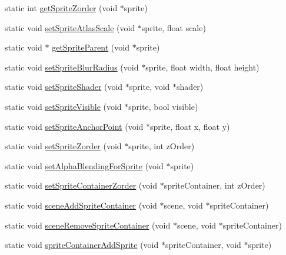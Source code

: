 \begin{DoxyCompactItemize}
\item 
static int \hyperlink{class_g_a_f_1_1_g_a_f_marmalade_g_f_x_a66e33e99c61c1c32fd5335f7a563b42e}{get\-Sprite\-Zorder} (void $\ast$sprite)
\item 
static void \hyperlink{class_g_a_f_1_1_g_a_f_marmalade_g_f_x_a4094142fd3844a976e0ca03a5c64098f}{set\-Sprite\-Atlas\-Scale} (void $\ast$sprite, float scale)
\item 
static void $\ast$ \hyperlink{class_g_a_f_1_1_g_a_f_marmalade_g_f_x_a2b2282d1facfe40492e1d26ebc6c99dd}{get\-Sprite\-Parent} (void $\ast$sprite)
\item 
static void \hyperlink{class_g_a_f_1_1_g_a_f_marmalade_g_f_x_a5139d0f53eee9c67fa0995b1a8a2c9a4}{set\-Sprite\-Blur\-Radius} (void $\ast$sprite, float width, float height)
\item 
static void \hyperlink{class_g_a_f_1_1_g_a_f_marmalade_g_f_x_a64d246d6346ac1bd7de834894e92ba5a}{set\-Sprite\-Shader} (void $\ast$sprite, void $\ast$shader)
\item 
static void \hyperlink{class_g_a_f_1_1_g_a_f_marmalade_g_f_x_ad959554fc1cb14e8cf36efe269669d1f}{set\-Sprite\-Visible} (void $\ast$sprite, bool visible)
\item 
static void \hyperlink{class_g_a_f_1_1_g_a_f_marmalade_g_f_x_a5a12ea4b0fe453a0fc8dd46a3504bbe3}{set\-Sprite\-Anchor\-Point} (void $\ast$sprite, float x, float y)
\item 
static void \hyperlink{class_g_a_f_1_1_g_a_f_marmalade_g_f_x_aa1ee9a51e41aef8ef9ad197d80e51bfd}{set\-Sprite\-Zorder} (void $\ast$sprite, int z\-Order)
\item 
static void \hyperlink{class_g_a_f_1_1_g_a_f_marmalade_g_f_x_a97f7a8f2f82bcf2286cc3daaeec65046}{set\-Alpha\-Blending\-For\-Sprite} (void $\ast$sprite)
\item 
static void \hyperlink{class_g_a_f_1_1_g_a_f_marmalade_g_f_x_aad2b1d54954271b383655900c7a9b704}{set\-Sprite\-Container\-Zorder} (void $\ast$sprite\-Container, int z\-Order)
\item 
static void \hyperlink{class_g_a_f_1_1_g_a_f_marmalade_g_f_x_aa9306a997c52bb7b03ef2e13cf73297c}{scene\-Add\-Sprite\-Container} (void $\ast$scene, void $\ast$sprite\-Container)
\item 
static void \hyperlink{class_g_a_f_1_1_g_a_f_marmalade_g_f_x_a4e64e1c2a13125991357524949ea9472}{scene\-Remove\-Sprite\-Container} (void $\ast$scene, void $\ast$sprite\-Container)
\item 
static void \hyperlink{class_g_a_f_1_1_g_a_f_marmalade_g_f_x_a2f34d292870b7b7878665489873d5aaa}{sprite\-Container\-Add\-Sprite} (void $\ast$sprite\-Container, void $\ast$sprite)

\end{DoxyCompactItemize}
